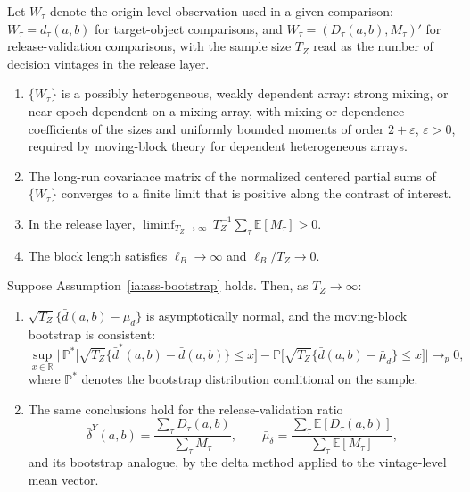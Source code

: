 \documentclass[a4paper,12pt]{article}
\newcommand{\E}{\mathbb{E}}
\newcommand{\Prb}{\mathbb{P}}
\newcommand{\1}{\mathbf{1}}
\begin{document}
\begin{iaassumption}
\label{ia:ass-bootstrap}
Let $W_\tau$ denote the origin-level observation used in a given comparison: $W_\tau=d_\tau(a,b)$ for target-object comparisons, and $W_\tau=(D_\tau(a,b),M_\tau)'$ for release-validation comparisons, with the sample size $T_Z$ read as the number of decision vintages in the release layer.
\begin{enumerate}[label=(\alph*), leftmargin=*]
    \item $\{W_\tau\}$ is a possibly heterogeneous, weakly dependent array: strong mixing, or near-epoch dependent on a mixing array, with mixing or dependence coefficients of the sizes and uniformly bounded moments of order $2+\varepsilon$, $\varepsilon>0$, required by moving-block theory for dependent heterogeneous arrays.
    \item The long-run covariance matrix of the normalized centered partial sums of $\{W_\tau\}$ converges to a finite limit that is positive along the contrast of interest.
    \item In the release layer, $\liminf_{T_Z\to\infty}\,T_Z^{-1}\sum_{\tau}\E[M_\tau]>0$.
    \item The block length satisfies $\ell_B\to\infty$ and $\ell_B/T_Z\to0$.
\end{enumerate}
\end{iaassumption}

\begin{iaproposition}
\label{ia:prop-bootstrap}
Suppose Assumption~\ref{ia:ass-bootstrap} holds. Then, as $T_Z\to\infty$:
\begin{enumerate}[label=(\roman*), leftmargin=*]
    \item $\sqrt{T_Z}\{\bar d(a,b)-\bar\mu_d\}$ is asymptotically normal, and the moving-block bootstrap is consistent:
    \[
        \sup_{x\in\mathbb R}\Big|\,\Prb^\ast\big[\sqrt{T_Z}\{\bar d^\ast(a,b)-\bar d(a,b)\}\le x\big]
        -\Prb\big[\sqrt{T_Z}\{\bar d(a,b)-\bar\mu_d\}\le x\big]\Big|\to_p 0 ,
    \]
    where $\Prb^\ast$ denotes the bootstrap distribution conditional on the sample.
    \item The same conclusions hold for the release-validation ratio
    \[
      \bar\delta^Y(a,b)=\frac{\sum_\tau D_\tau(a,b)}{\sum_\tau M_\tau},
      \qquad
      \bar\mu_\delta=\frac{\sum_\tau\E[D_\tau(a,b)]}{\sum_\tau\E[M_\tau]},
    \]
    and its bootstrap analogue, by the delta method applied to the vintage-level mean vector.
\end{enumerate}
\end{iaproposition}
\end{document}
